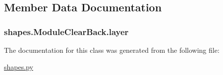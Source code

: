 \subsection{Member Data Documentation}
\hypertarget{classshapes_1_1_module_clear_back_ac5bf7831e42f93c24d5c3be3c0250687}{}
\subsubsection[{layer}]{\setlength{\rightskip}{0pt plus 5cm}shapes.\+Module\+Clear\+Back.\+layer}\label{classshapes_1_1_module_clear_back_ac5bf7831e42f93c24d5c3be3c0250687}


The documentation for this class was generated from the following file\+:\begin{DoxyCompactItemize}
\item 
\hyperlink{shapes_8py}{shapes.\+py}\end{DoxyCompactItemize}
